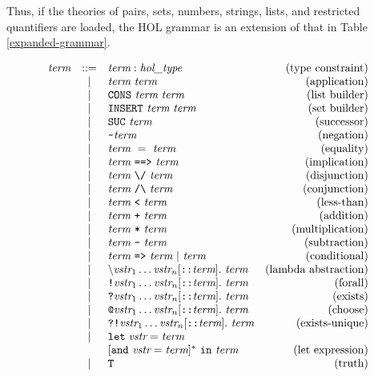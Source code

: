 Thus, if the theories of pairs, sets, numbers, strings, lists, and
restricted quantifiers are loaded, the HOL grammar is an extension of
that in Table \ref{expanded-grammar}.  
 \begin{table}
 \[
 \begin{array}{rclr}
  \term & ::= & \term : \type & \mbox{(type constraint)} \\
  & | & \term\ \term & \mbox{(application)} \\
  & | & \CONS\ \term \ \term & \mbox{(list builder)} \\
  & | & \INSERT\ \term \ \term & \mbox{(set builder)} \\
  & | & \SUC\ \term & \mbox{(successor)} \\
  & | & \verb+~+ \term & \mbox{(negation)} \\
  & | & \term\ =\ \term & \mbox{(equality)} \\
  & | & \term\ \IMP\ \term & \mbox{(implication)} \\
  & | & \term\ \verb+\/+\ \term & \mbox{(disjunction)} \\
  & | & \term\ \verb+/\+\ \term & \mbox{(conjunction)} \\
  & | & \term\ \verb+<+ \ \term & \mbox{(less-than)} \\
  & | & \term\ \verb!+! \ \term & \mbox{(addition)} \\
  & | & \term\ \verb!*! \ \term & \mbox{(multiplication)} \\
  & | & \term\ \verb!-! \ \term & \mbox{(subtraction)} \\
  & | & \term\ \verb+=>+\ \term\ |\ \term & \mbox{(conditional)} \\
  & | & \bs\vstr_1\ldots\vstr_n[\verb+::+\term].\ \term & \mbox{(lambda abstraction)} \\
  & | & \ALL \vstr_1\ldots\vstr_n[\verb+::+\term].\ \term & \mbox{(forall)} \\
  & | & \EXISTS \vstr_1\ldots\vstr_n[\verb+::+\term].\ \term & \mbox{(exists)} \\
  & | & \CHOOSE \vstr_1\ldots\vstr_n[\verb+::+\term].\ \term & \mbox{(choose)} \\
  & | & \EXISTSONE \vstr_1\ldots\vstr_n[\verb+::+\term].\ \term &\mbox{(exists-unique)} \\
  & | & \LET\; \vstr = \term  & \\
  &   & [\und\ \vstr = \term]^{*}\ \IN\ \term & \mbox{(let expression)} \\
  & | & \verb+T+ & \mbox{(truth)} \\

\end{array}\]
\end{table}
